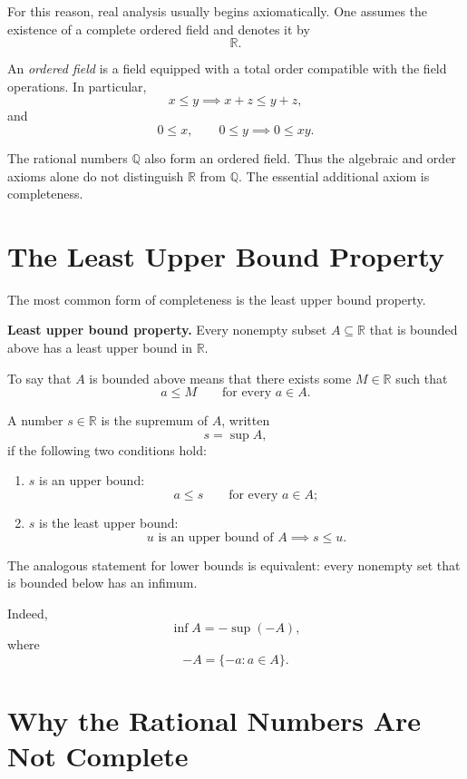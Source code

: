 \documentclass{essay}
\begin{document}
For this reason, real analysis usually begins axiomatically. One assumes the existence of a complete ordered field and denotes it by
\[
\mathbb{R}.
\]

An \emph{ordered field} is a field equipped with a total order compatible with the field operations. In particular,
\[
x \leq y \implies x+z \leq y+z,
\]
and
\[
0\leq x,\qquad 0\leq y
\implies
0\leq xy.
\]

The rational numbers \(\mathbb{Q}\) also form an ordered field. Thus the algebraic and order axioms alone do not distinguish \(\mathbb{R}\) from \(\mathbb{Q}\). The essential additional axiom is completeness.

\section{The Least Upper Bound Property}

The most common form of completeness is the least upper bound property.

\medskip

\noindent
\textbf{Least upper bound property.}
Every nonempty subset \(A\subseteq\mathbb{R}\) that is bounded above has a least upper bound in \(\mathbb{R}\).

\medskip

To say that \(A\) is bounded above means that there exists some \(M\in\mathbb{R}\) such that
\[
a\leq M
\qquad
\text{for every } a\in A.
\]

A number \(s\in\mathbb{R}\) is the supremum of \(A\), written
\[
s=\sup A,
\]
if the following two conditions hold:

\begin{enumerate}
    \item \(s\) is an upper bound:
    \[
    a\leq s
    \qquad
    \text{for every } a\in A;
    \]

    \item \(s\) is the least upper bound:
    \[
    u \text{ is an upper bound of } A
    \implies
    s\leq u.
    \]
\end{enumerate}

The analogous statement for lower bounds is equivalent: every nonempty set that is bounded below has an infimum.

Indeed,
\[
\inf A = -\sup(-A),
\]
where
\[
-A=\{-a:a\in A\}.
\]

\section{Why the Rational Numbers Are Not Complete}
\end{document}
